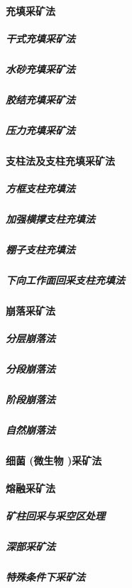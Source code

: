 \documentclass[UTF8]{../../ApplicationUniverse}
\begin{document}
            \paragraph{充填采矿法}
                \subparagraph{干式充填采矿法}
                \subparagraph{水砂充填采矿法}
                \subparagraph{胶结充填采矿法}
                \subparagraph{压力充填采矿法}
            \paragraph{支柱法及支柱充填采矿法}
                \subparagraph{方框支柱充填法}
                \subparagraph{加强横撑支柱充填法}
                \subparagraph{棚子支柱充填法}
                \subparagraph{下向工作面回采支柱充填法}
            \paragraph{崩落采矿法}
                \subparagraph{分层崩落法}
                \subparagraph{分段崩落法}
                \subparagraph{阶段崩落法}
                \subparagraph{自然崩落法}
            \paragraph{细菌 (微生物 )采矿法}
            \paragraph{熔融采矿法}
                \subparagraph{矿柱回采与采空区处理}
                \subparagraph{深部采矿法}
                \subparagraph{特殊条件下采矿法}
\end{document}
